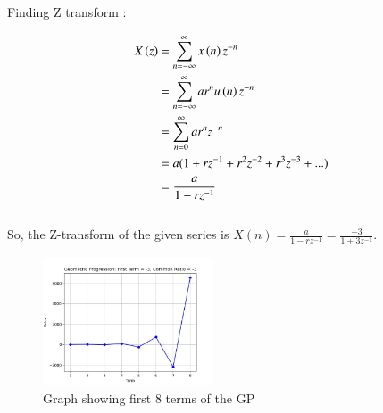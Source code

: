 \documentclass[journal,12pt,twocolumn]{IEEEtran}
\begin{document}
Finding Z transform : 

\begin{align}
    X \left(z\right) & = \sum_{n=-\infty}^{\infty} x \left(n\right)   z^{-n} \\
    & = \sum_{n=-\infty}^{\infty} ar^n  u \left(n\right)   z^{-n} \\
    & = \sum_{n=0}^{\infty} ar^n  z^{-n} \\
    & = a( 1 + rz^{-1} + r^{2}z^{-2} + r^{3}z^{-3} +...)\\
    & = \frac{a}{{1 - rz^{-1}}} 
\end{align}
\hspace{3cm} \\
So, the Z-transform of the given series is
$X(n)=\frac{a}{1-rz^{-1}}= \frac{-3}{1+3z^{-1}}$.\\
\begin{figure}[ht]
        \centering
        \includegraphics[width=0.45\textwidth]{figs/graph.jpeg}
        \centering
        \caption{    Graph showing first 8 terms of the GP}
    \end{figure} 
    

\end{document}
